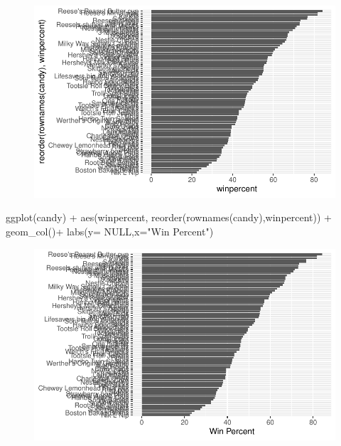 \documentclass[
  letterpaper,
  DIV=11,
  numbers=noendperiod]{scrartcl}
\newenvironment{Shaded}{\begin{snugshade}}{\end{snugshade}}
\newcommand{\AttributeTok}[1]{\textcolor[rgb]{0.40,0.45,0.13}{#1}}
\newcommand{\ConstantTok}[1]{\textcolor[rgb]{0.56,0.35,0.01}{#1}}
\newcommand{\FunctionTok}[1]{\textcolor[rgb]{0.28,0.35,0.67}{#1}}
\newcommand{\NormalTok}[1]{\textcolor[rgb]{0.00,0.23,0.31}{#1}}
\newcommand{\SpecialCharTok}[1]{\textcolor[rgb]{0.37,0.37,0.37}{#1}}
\newcommand{\StringTok}[1]{\textcolor[rgb]{0.13,0.47,0.30}{#1}}
\begin{document}
\begin{figure}[H]

{\centering \includegraphics{class09_files/figure-pdf/unnamed-chunk-17-1.pdf}

}

\end{figure}

\begin{Shaded}
\begin{Highlighting}[]
\FunctionTok{ggplot}\NormalTok{(candy) }\SpecialCharTok{+} 
  \FunctionTok{aes}\NormalTok{(winpercent, }\FunctionTok{reorder}\NormalTok{(}\FunctionTok{rownames}\NormalTok{(candy),winpercent)) }\SpecialCharTok{+}
  \FunctionTok{geom\_col}\NormalTok{()}\SpecialCharTok{+}
  \FunctionTok{labs}\NormalTok{(}\AttributeTok{y=} \ConstantTok{NULL}\NormalTok{,}\AttributeTok{x=}\StringTok{"Win Percent"}\NormalTok{)}
\end{Highlighting}
\end{Shaded}

\begin{figure}[H]

{\centering \includegraphics{class09_files/figure-pdf/unnamed-chunk-18-1.pdf}

}

\end{figure}
\end{document}
